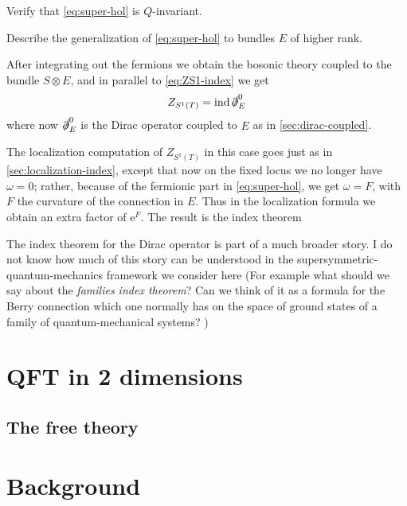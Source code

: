 \documentclass[12pt,letterpaper,reqno]{article}
\numberwithin{equation}{section}
\newcommand{\dirac}{\slashed{\partial}}
\newcommand{\e}{{\mathrm e}}
\newcommand{\ti}[1]{\textit{#1}}
\DeclareMathOperator{\ind}{ind}
\newcommand{\fixme}[1]{{\color{orange}{[#1]}}}
\begin{document}
\begin{exercise}
Verify that \eqref{eq:super-hol} is $Q$-invariant.
\end{exercise}

\begin{exercise}
Describe the generalization of \eqref{eq:super-hol} to bundles $E$ of higher rank. \fixme{hard?}
\end{exercise}

After integrating out the fermions we obtain the
bosonic theory coupled to the bundle $S \otimes E$, and
in parallel to \eqref{eq:ZS1-index} we get
\begin{equation}
  Z_{S^1(T)} = \ind \dirac^0_E
\end{equation}
where now $\dirac^0_E$ is the Dirac operator coupled to $E$ as
in \autoref{sec:dirac-coupled}.

The localization computation of $Z_{S^1(T)}$ in this case goes just as in
\autoref{sec:localization-index},
except that now on the fixed locus we no longer have $\omega = 0$; rather,
because of the fermionic part in \eqref{eq:super-hol}, we get $\omega = F$, 
with $F$ the curvature of the connection in $E$. Thus in the localization formula we obtain
an extra factor of $\e^F$. The result is the index theorem
\fixme{...}

\fixme{case of higher rank $E$}

The index theorem for the Dirac operator is part of a much broader
story. I do not know how much of this story can be understood in the
supersymmetric-quantum-mechanics framework we consider here
(For example what should we say about the \ti{families index theorem}?
Can we think of it as a formula for the Berry connection which one normally has 
on the space of ground states of a family of quantum-mechanical systems?
\fixme{Alvarez-Windey})


\fixme{remark: this gives Gauss-Bonnet if $E = S$, or signature theorem}


\section{QFT in 2 dimensions}

\subsection{The free theory}

\appendix

\section{Background}
\end{document}
